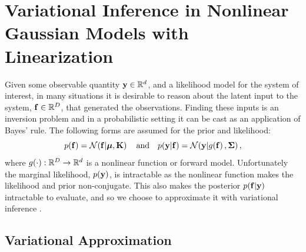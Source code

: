 \documentclass{article} %
\begin{document}
\section{Variational Inference in Nonlinear Gaussian Models with Linearization}
\label{sec:gausmod}

Given some observable quantity $\mathbf{y} \in \mathbb{R}^{d}$, and a likelihood model for
the system of interest, in many situations it is desirable to reason about the
latent input to the system, $\mathbf{f}\in\mathbb{R}^{D}$, that generated the
observations. Finding these inputs is an inversion problem and in a
probabilistic setting it can be cast as an application of Bayes' rule.
The following forms are assumed for the prior and likelihood:
\begin{equation}
    p\!\left({\mathbf{f}}\right) = \mathcal{N}\!\left({\mathbf{f}}\middle\vert{\ensuremath{\boldsymbol{\mu}}, \ensuremath{\mathbf{K}}}\right)
    \quad \text{and} \quad
    p\!\left({\mathbf{y}}\middle\vert{\ensuremath{\mathbf{f}}}\right) = \mathcal{N}\!\left({\mathbf{y}}\middle\vert{\ensuremath{g\!\left({{\mathbf{f}}}\right)}, \ensuremath{\boldsymbol{\Sigma}}}\right),
    \label{eq:priorlike}
\end{equation}
where $g\!\left({{\cdot}}\right) : \mathbb{R}^{D} \to \mathbb{R}^{d}$ is a nonlinear function or
forward model. Unfortunately the marginal likelihood, $p\!\left({\mathbf{y}}\right)$, is
intractable as the nonlinear function makes the likelihood and prior
non-conjugate.
This also makes the posterior $p\!\left({\mathbf{f}}\middle\vert{\ensuremath{\mathbf{y}}}\right)$ intractable to evaluate,
and so we choose to approximate it with variational inference 
\cite{Jordan1999}.


\subsection{Variational Approximation}
\end{document}

